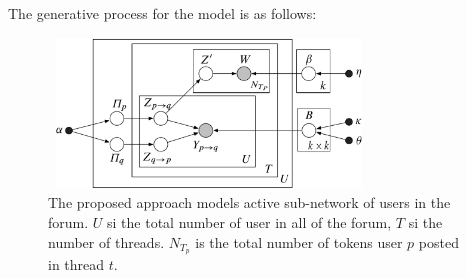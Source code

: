 \documentclass{sig-alternate}
\begin{document}
The generative process for the model is as follows:

\begin{figure}
\centering
\includegraphics[height=4cm,width=8.5cm]{model.pdf}
\caption{The proposed approach models active sub-network of users in the forum.
$U$ si the total number of user in all of the forum, $T$ si the number of
threads. $N_{T_p}$ is the total number of tokens user $p$ posted in thread $t$.
}
\label{fig:finalThreadAggregationModel}
\end{figure}
\end{document}
